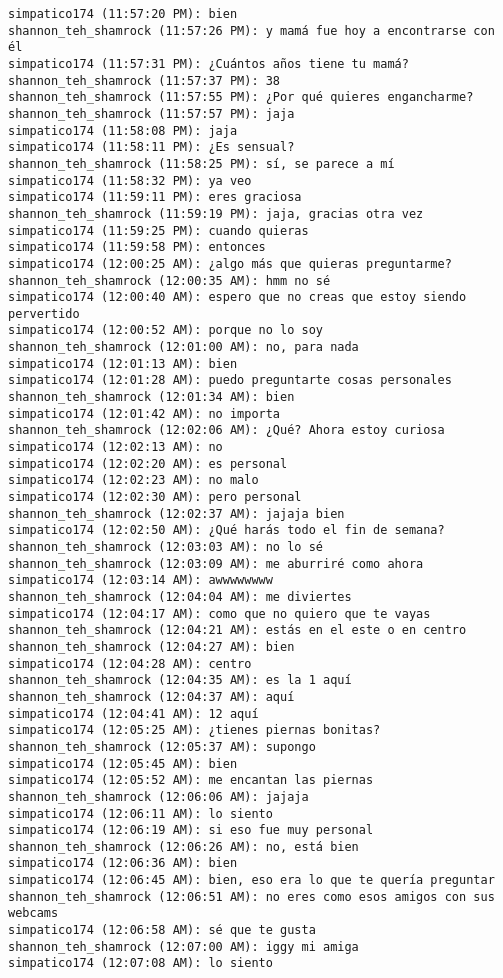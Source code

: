 \begin{verbatim}
simpatico174 (11:57:20 PM): bien
shannon_teh_shamrock (11:57:26 PM): y mamá fue hoy a encontrarse con él
simpatico174 (11:57:31 PM): ¿Cuántos años tiene tu mamá?
shannon_teh_shamrock (11:57:37 PM): 38
shannon_teh_shamrock (11:57:55 PM): ¿Por qué quieres engancharme?
shannon_teh_shamrock (11:57:57 PM): jaja
simpatico174 (11:58:08 PM): jaja
simpatico174 (11:58:11 PM): ¿Es sensual?
shannon_teh_shamrock (11:58:25 PM): sí, se parece a mí
simpatico174 (11:58:32 PM): ya veo
simpatico174 (11:59:11 PM): eres graciosa
shannon_teh_shamrock (11:59:19 PM): jaja, gracias otra vez
simpatico174 (11:59:25 PM): cuando quieras
simpatico174 (11:59:58 PM): entonces
simpatico174 (12:00:25 AM): ¿algo más que quieras preguntarme?
shannon_teh_shamrock (12:00:35 AM): hmm no sé
simpatico174 (12:00:40 AM): espero que no creas que estoy siendo pervertido
simpatico174 (12:00:52 AM): porque no lo soy
shannon_teh_shamrock (12:01:00 AM): no, para nada
simpatico174 (12:01:13 AM): bien
simpatico174 (12:01:28 AM): puedo preguntarte cosas personales
shannon_teh_shamrock (12:01:34 AM): bien
simpatico174 (12:01:42 AM): no importa
shannon_teh_shamrock (12:02:06 AM): ¿Qué? Ahora estoy curiosa
simpatico174 (12:02:13 AM): no
simpatico174 (12:02:20 AM): es personal
simpatico174 (12:02:23 AM): no malo
simpatico174 (12:02:30 AM): pero personal
shannon_teh_shamrock (12:02:37 AM): jajaja bien
simpatico174 (12:02:50 AM): ¿Qué harás todo el fin de semana?
shannon_teh_shamrock (12:03:03 AM): no lo sé
shannon_teh_shamrock (12:03:09 AM): me aburriré como ahora
simpatico174 (12:03:14 AM): awwwwwwww
shannon_teh_shamrock (12:04:04 AM): me diviertes
simpatico174 (12:04:17 AM): como que no quiero que te vayas
shannon_teh_shamrock (12:04:21 AM): estás en el este o en centro
shannon_teh_shamrock (12:04:27 AM): bien
simpatico174 (12:04:28 AM): centro
shannon_teh_shamrock (12:04:35 AM): es la 1 aquí
shannon_teh_shamrock (12:04:37 AM): aquí
simpatico174 (12:04:41 AM): 12 aquí
simpatico174 (12:05:25 AM): ¿tienes piernas bonitas?
shannon_teh_shamrock (12:05:37 AM): supongo
simpatico174 (12:05:45 AM): bien
simpatico174 (12:05:52 AM): me encantan las piernas
shannon_teh_shamrock (12:06:06 AM): jajaja
simpatico174 (12:06:11 AM): lo siento
simpatico174 (12:06:19 AM): si eso fue muy personal
shannon_teh_shamrock (12:06:26 AM): no, está bien
simpatico174 (12:06:36 AM): bien
simpatico174 (12:06:45 AM): bien, eso era lo que te quería preguntar
shannon_teh_shamrock (12:06:51 AM): no eres como esos amigos con sus webcams
simpatico174 (12:06:58 AM): sé que te gusta
shannon_teh_shamrock (12:07:00 AM): iggy mi amiga
simpatico174 (12:07:08 AM): lo siento

\end{verbatim}
